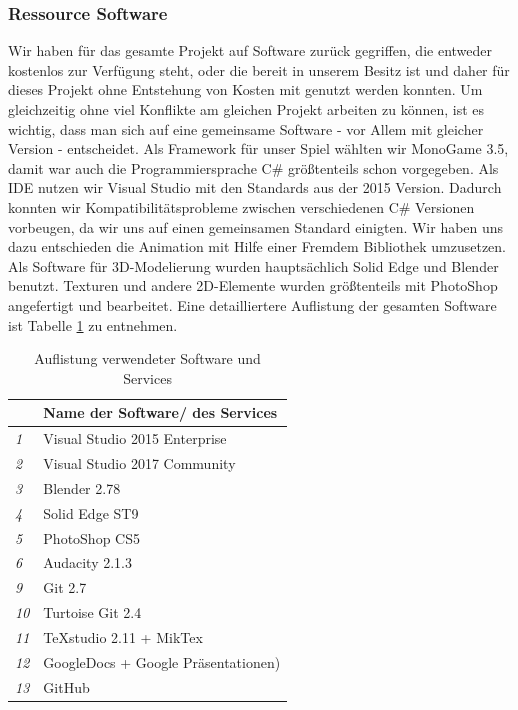 \documentclass[12pt]{article}
\begin{document}
\subsubsection{Ressource Software}
Wir haben für das gesamte Projekt auf Software zurück gegriffen, die entweder kostenlos zur Verfügung steht, oder die bereit in unserem Besitz ist und daher für dieses Projekt ohne Entstehung von Kosten mit genutzt werden konnten.\newline
Um gleichzeitig ohne viel Konflikte am gleichen Projekt arbeiten zu können, ist es wichtig, dass man sich auf eine gemeinsame Software - vor Allem mit gleicher Version - entscheidet. \newline
Als Framework für unser Spiel wählten wir MonoGame 3.5, damit war auch die Programmiersprache C\# größtenteils schon vorgegeben. Als IDE nutzen wir Visual Studio mit den Standards aus der 2015 Version.
Dadurch konnten wir Kompatibilitätsprobleme zwischen verschiedenen C\# Versionen vorbeugen, da wir uns auf einen gemeinsamen Standard einigten.
Wir haben uns dazu entschieden die Animation mit Hilfe einer Fremdem Bibliothek umzusetzen. \newline
Als Software für 3D-Modelierung wurden hauptsächlich Solid Edge und Blender benutzt. Texturen und andere 2D-Elemente wurden größtenteils mit PhotoShop angefertigt und bearbeitet.
Eine detailliertere Auflistung der gesamten Software ist Tabelle \ref{tbl:software} zu entnehmen.
\begin{table}[H]
\centering
	\begin{tabular}{p{0.5cm}p{9cm}}
		\textbf{ }  & \textbf{Name der Software/ des Services} \\
		\hline
		\textit{1}          & \textnormal{Visual Studio 2015 Enterprise}            \\
		\textit{2}          & \textnormal{Visual Studio 2017 Community}            \\
		\textit{3}          & \textnormal{Blender 2.78}            \\
		\textit{4}          & \textnormal{Solid Edge ST9}            \\
		\textit{5}          & \textnormal{PhotoShop CS5}            \\
		\textit{6}          & \textnormal{Audacity 2.1.3}            \\
		\textit{9}          & \textnormal{Git 2.7}  \\
		\textit{10}          & \textnormal{Turtoise Git 2.4}            \\
		\textit{11}          & \textnormal{TeXstudio 2.11 + MikTex}       \\
		\textit{12}          & \textnormal{GoogleDocs + Google Präsentationen)}  \\
		\textit{13}          & \textnormal{GitHub}  \\
		\hline
	\end{tabular}
	\caption{Auflistung verwendeter Software und Services}	
	\label{tbl:software}	
\end{table}
\end{document}
